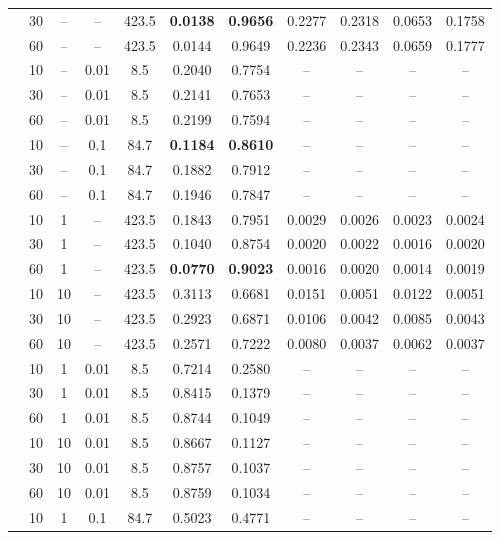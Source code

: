 \documentclass[11pt,twocolumn,a4paper,DIV=calc,parskip=half]{scrartcl}
\begin{document}
\begin{longtable}{@{}l c c c c c c c c c c@{}}
	& 30 & -- & -- & 423.5 & \textbf{0.0138} & \textbf{0.9656} & 0.2277 & 0.2318 & 0.0653 & 0.1758 \\
	& 60 & -- & -- & 423.5 & 0.0144 & 0.9649 & 0.2236 & 0.2343 & 0.0659 & 0.1777 \\
	\arrayrulecolor{gray!60}\midrule\arrayrulecolor{black}
	\multirow{6}{*}{\textbf{TopK}} & 10 & -- & 0.01 & 8.5 & 0.2040 & 0.7754 & -- & -- & -- & -- \\
	& 30 & -- & 0.01 & 8.5 & 0.2141 & 0.7653 & -- & -- & -- & -- \\
	& 60 & -- & 0.01 & 8.5 & 0.2199 & 0.7594 & -- & -- & -- & -- \\
	& 10 & -- & 0.1 & 84.7 & \textbf{0.1184} & \textbf{0.8610} & -- & -- & -- & -- \\
	& 30 & -- & 0.1 & 84.7 & 0.1882 & 0.7912 & -- & -- & -- & -- \\
	& 60 & -- & 0.1 & 84.7 & 0.1946 & 0.7847 & -- & -- & -- & -- \\
	\arrayrulecolor{gray!60}\midrule\arrayrulecolor{black}
	\multirow{6}{*}{\textbf{DP + FLTrust}} & 10 & 1 & -- & 423.5 & 0.1843 & 0.7951 & 0.0029 & 0.0026 & 0.0023 & 0.0024 \\
	& 30 & 1 & -- & 423.5 & 0.1040 & 0.8754 & 0.0020 & 0.0022 & 0.0016 & 0.0020 \\
	& 60 & 1 & -- & 423.5 & \textbf{0.0770} & \textbf{0.9023} & 0.0016 & 0.0020 & 0.0014 & 0.0019 \\
	& 10 & 10 & -- & 423.5 & 0.3113 & 0.6681 & 0.0151 & 0.0051 & 0.0122 & 0.0051 \\
	& 30 & 10 & -- & 423.5 & 0.2923 & 0.6871 & 0.0106 & 0.0042 & 0.0085 & 0.0043 \\
	& 60 & 10 & -- & 423.5 & 0.2571 & 0.7222 & 0.0080 & 0.0037 & 0.0062 & 0.0037 \\
	\arrayrulecolor{gray!60}\midrule\arrayrulecolor{black}
	\multirow{12}{*}{\textbf{DP + TopK}} & 10 & 1 & 0.01 & 8.5 & 0.7214 & 0.2580 & -- & -- & -- & -- \\
	& 30 & 1 & 0.01 & 8.5 & 0.8415 & 0.1379 & -- & -- & -- & -- \\
	& 60 & 1 & 0.01 & 8.5 & 0.8744 & 0.1049 & -- & -- & -- & -- \\
	& 10 & 10 & 0.01 & 8.5 & 0.8667 & 0.1127 & -- & -- & -- & -- \\
	& 30 & 10 & 0.01 & 8.5 & 0.8757 & 0.1037 & -- & -- & -- & -- \\
	& 60 & 10 & 0.01 & 8.5 & 0.8759 & 0.1034 & -- & -- & -- & -- \\
	& 10 & 1 & 0.1 & 84.7 & 0.5023 & 0.4771 & -- & -- & -- & -- \\

\end{longtable}
\end{document}
